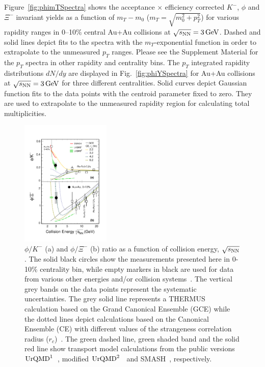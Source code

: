 \documentclass[%
 reprint,	
showpacs,
 amsmath,amssymb,
 aps,
 superscriptaddress,
]{revtex4-1}
\begin{document}
Figure~\ref{fig:phimTSpectra} shows the acceptance $\times$ efficiency corrected $K^-$, $\phi$ and $\Xi^-$ invariant yields as a function of $m_T-m_0$ ($m_T = \sqrt{m_{0}^{2}+p_{T}^2}$) for various rapidity ranges in 0--10\% central Au+Au collisions at ${\sqrt{s_{\rm NN}} = \rm{3\,GeV}}$. %
Dashed and solid lines depict fits to the spectra with the $m_T$-exponential function in order to extrapolate to the unmeasured $p_T$ ranges. Please see the Supplement Material for the $p_T$ spectra in other rapidity and centrality bins.
The $p_T$ integrated rapidity distributions $dN/dy$ are displayed in Fig.~\ref{fig:phiYSpectra} for Au+Au collisions at ${\sqrt{s_{\rm NN}} = \rm{3\,GeV}}$ for three different centralities. %
Solid curves depict Gaussian function fits to the data points with the centroid parameter fixed to zero. They are used to extrapolate to the unmeasured rapidity region for calculating total multiplicities.


\begin{figure}
\centering
\hspace*{-4mm}
\includegraphics[width=0.38\textwidth]{fig4_phi_over_kminus_zoomin.pdf}
  \caption{$\phi/K^-$ (a) and $\phi/\Xi^-$ (b) ratio as a function of collision energy, $\sqrt{s_{\rm NN}}$. The solid black circles show the measurements presented here in 0-10\% centrality bin, while empty markers in black are used for data from various other energies and/or collision systems~\cite{E917_phi,NA49_phi,FOPI_phi_AlAl,FOPI_phi_NiNi,HADES_phi_ArKCl,HADES_phi_AuAu,Xi_ArKCl_HADES,star_bes_strangeness}. The vertical grey bands on the data points represent the systematic uncertainties. The grey solid line represents a THERMUS calculation based on the Grand Canonical Ensemble (GCE) while the dotted lines depict calculations based on the Canonical Ensemble (CE) with different values of the strangeness correlation radius ($r_c$)~\cite{THERMUS_WHEATON200984,Andronic_2018Naure}. The green dashed line, green shaded band and the solid red line show transport model calculations from the public versions $\textup{UrQMD}^{1}$~\cite{urQMD,UrQMD_2}, modified $\textup{UrQMD}^{2}$~\cite{Steinheimer_2015_UrQMD} and SMASH~\cite{Elfner_SMASH}, respectively.}
\label{fig:phi2Kratio} 
\end{figure}
\end{document}
